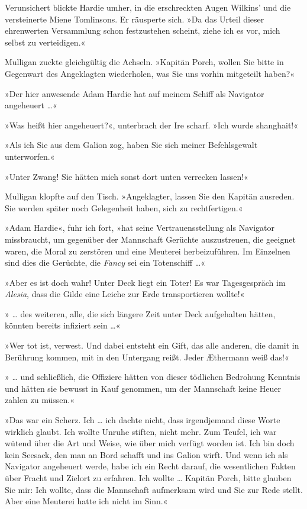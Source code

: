 Verunsichert blickte Hardie umher, in die erschreckten Augen
Wilkins’ und die versteinerte Miene Tomlinsons. Er räusperte sich.
»Da das Urteil dieser ehrenwerten Versammlung schon festzustehen
scheint, ziehe ich es vor, mich selbst zu verteidigen.«

Mulligan zuckte gleichgültig die Achseln. »Kapitän Porch, wollen
Sie bitte in Gegenwart des Angeklagten wiederholen, was Sie uns
vorhin mitgeteilt haben?«

»Der hier anwesende Adam Hardie hat auf meinem Schiff als Navigator
angeheuert \ldots{}«

»Was heißt hier angeheuert?«, unterbrach der Ire scharf. »Ich wurde
shanghait!«

»Als ich Sie aus dem Galion zog, haben Sie sich meiner
Befehlsgewalt unterworfen.«

»Unter Zwang! Sie hätten mich sonst dort unten verrecken lassen!«

Mulligan klopfte auf den Tisch. »Angeklagter, lassen Sie den
Kapitän ausreden. Sie werden später noch Gelegenheit haben, sich zu
rechtfertigen.«

»Adam Hardie«, fuhr ich fort, »hat seine Vertrauensstellung als
Navigator missbraucht, um gegenüber der Mannschaft Gerüchte
auszustreuen, die geeignet waren, die Moral zu zerstören und eine
Meuterei herbeizuführen. Im Einzelnen sind dies die Gerüchte, die
\emph{Fancy} sei ein Totenschiff \ldots{}«

»Aber es ist doch wahr! Unter Deck liegt ein Toter! Es war
Tagesgespräch im \emph{Alesia}, dass die Gilde eine Leiche zur Erde
transportieren wollte!«

» \ldots{} des weiteren, alle, die sich längere Zeit unter Deck
aufgehalten hätten, könnten bereits infiziert sein \ldots{}«

»Wer tot ist, verwest. Und dabei entsteht ein Gift, das alle
anderen, die damit in Berührung kommen, mit in den Untergang reißt.
Jeder Æthermann weiß das!«

» \ldots{} und schließlich, die Offiziere hätten von dieser tödlichen
Bedrohung Kenntnis und hätten sie bewusst in Kauf genommen, um der
Mannschaft keine Heuer zahlen zu müssen.«

»Das war ein Scherz. Ich \ldots{} ich dachte nicht, dass irgendjemand
diese Worte wirklich glaubt. Ich wollte Unruhe stiften, nicht mehr.
Zum Teufel, ich war wütend über die Art und Weise, wie über mich
verfügt worden ist. Ich bin doch kein Seesack, den man an Bord
schafft und ins Galion wirft. Und wenn ich als Navigator angeheuert
werde, habe ich ein Recht darauf, die wesentlichen Fakten über
Fracht und Zielort zu erfahren. Ich wollte \ldots{} Kapitän Porch, bitte
glauben Sie mir: Ich wollte, dass die Mannschaft aufmerksam wird
und Sie zur Rede stellt. Aber eine Meuterei hatte ich nicht im
Sinn.«

